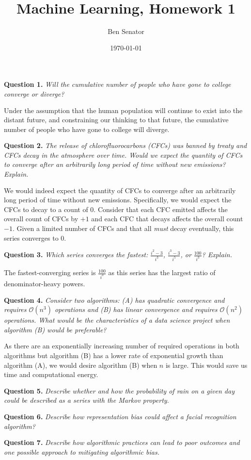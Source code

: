 \documentclass[11pt]{article}
\title{Machine Learning, Homework 1}
\author{Ben Senator}
\date{\today}
\begin{document}
\maketitle

\textbf{Question 1.} \textit{Will the cumulative number of people who have gone to college converge or diverge?}

Under the assumption that the human population will continue to exist into the distant future, and constraining our thinking to that future, the cumulative number of people who have gone to college will diverge.

\textbf{Question 2.} \textit{The release of chlorofluorocarbons (CFCs) was banned by treaty and CFCs decay in the atmosphere over time. Would we expect the quantity of CFCs to converge after an arbitrarily long period of time without new emissions? Explain.}

We would indeed expect the quantity of CFCs to converge after an arbitrarily long period of time without new emissions. 
Specifically, we would expect the CFCs to decay to a count of 0. 
Consider that each CFC emitted affects the overall count of CFCs by $+1$ and each CFC that decays affects the overall count $-1$.
Given a limited number of CFCs and that all \textit{must} decay eventually, this series converges to 0.

\textbf{Question 3.} \textit{Which series converges the fastest: $\frac{i^2-3}{i^3}$, $\frac{i^3-3}{i^5}$, or $\frac{100}{i^3}$? Explain.}

The fastest-converging series is $\frac{100}{i^3}$ as this series has the largest ratio of denominator-heavy powers.

\textbf{Question 4.} \textit{Consider two algorithms: (A) has quadratic convergence and requires $\mathcal{O}(n^3)$ operations and (B) has linear convergence and requires $\mathcal{O}(n^2)$ operations. What would be the characteristics of a data science project when algorithm (B) would be preferable?}

As there are an exponentially increasing number of required operations in both algorithms but algorithm (B) has a lower rate of exponential growth than algorithm (A), we would desire algorithm (B) when $n$ is large.
This would save us time and computational energy.

\textbf{Question 5.} \textit{Describe whether and how the probability of rain on a given day could be described as a series with the Markov property.}

\textbf{Question 6.} \textit{Describe how representation bias could affect a facial recognition algorithm?}

\textbf{Question 7.} \textit{Describe how algorithmic practices can lead to poor outcomes and one possible approach to mitigating algorithmic bias.}
\end{document}
